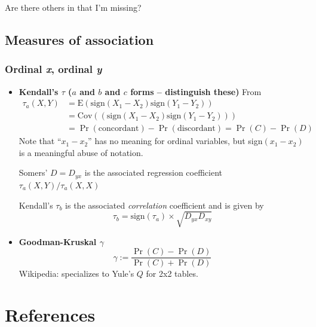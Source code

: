\documentclass[
  11pt,
  fleqn
]{article}
\begin{document}
  Are there others in \citet{agrestiAnalysisOrdinalCategorical2010}
  that I'm missing?

  \subsection{Measures of association}

  \subsubsection{Ordinal \emph{x}, ordinal \emph{y}}

  \begin{itemize}
    \item \textbf{Kendall's $\tau$ ($a$ and $b$ and $c$ forms --
      \textbf{distinguish these})}
      From \citet{newsonParametersNonparametricStatistics2002}
      \begin{align*}
        \tau_a(X,Y)
        &= \mathrm{E}\left(\text{sign}(X_1-X_2)\text{sign}(Y_1-Y_2)\right) \\
        &=
        \mathrm{Cov}(\left(\text{sign}(X_1-X_2)\text{sign}(Y_1-Y_2)\right)) \\
        &= \Pr\left(\text{concordant}\right) -
        \Pr\left(\text{discordant}\right) = \Pr\left(C\right) -
        \Pr\left(D\right)
      \end{align*}
      Note that ``$x_1 - x_2$'' has no meaning for ordinal variables, but
      sign$(x_1 - x_2)$ is a meaningful abuse of notation.

      Somers' $D = D_{yx}$ is the associated regression coefficient
      $\tau_a(X, Y)/\tau_a(X, X)$

      Kendall's $\tau_b$ is the associated \emph{correlation} coefficient
      and is given by
      \[
        \tau_b = \text{sign}(\tau_a) \times \sqrt{D_{yx} D_{xy}}
      \]

    \item \textbf{Goodman-Kruskal $\gamma$} \[\gamma :=\frac{\Pr(C) -
      \Pr(D)}{\Pr(C) + \Pr(D)}\] Wikipedia: specializes to Yule's $Q$
      for 2x2 tables.

  \end{itemize}

  \newpage

  \section{References}
  \printbibliography

  
\end{document}
